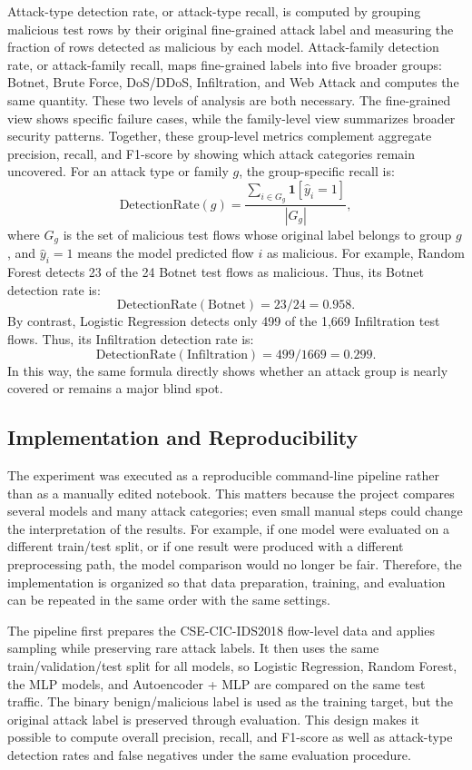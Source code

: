 \documentclass[sigconf,nonacm]{acmart}
\begin{document}
Attack-type detection rate, or attack-type recall, is computed by grouping malicious test rows by their original fine-grained attack label and measuring the fraction of rows detected as malicious by each model.
Attack-family detection rate, or attack-family recall, maps fine-grained labels into five broader groups: Botnet, Brute Force, DoS/DDoS, Infiltration, and Web Attack and computes the same quantity.
These two levels of analysis are both necessary.
The fine-grained view shows specific failure cases, while the family-level view summarizes broader security patterns.
Together, these group-level metrics complement aggregate precision, recall, and F1-score by showing which attack categories remain uncovered.
For an attack type or family \(g\), the group-specific recall is:
\begin{equation}
\mathrm{DetectionRate}(g) =
\frac{\sum_{i \in G_g} \mathbf{1}[\hat{y}_i = 1]}
{|G_g|},
\end{equation}
where \(G_g\) is the set of malicious test flows whose original label belongs to group \(g\), and \(\hat{y}_i=1\) means the model predicted flow \(i\) as malicious.
For example, Random Forest detects 23 of the 24 Botnet test flows as malicious.
Thus, its Botnet detection rate is:
\[
\mathrm{DetectionRate}(\mathrm{Botnet}) = 23/24 = 0.958.
\]
By contrast, Logistic Regression detects only 499 of the 1,669 Infiltration test flows.
Thus, its Infiltration detection rate is:
\[
\mathrm{DetectionRate}(\mathrm{Infiltration}) = 499/1669 = 0.299.
\]
In this way, the same formula directly shows whether an attack group is nearly covered or remains a major blind spot.

\subsection{Implementation and Reproducibility}

The experiment was executed as a reproducible command-line pipeline rather than as a manually edited notebook.
This matters because the project compares several models and many attack categories; even small manual steps could change the interpretation of the results.
For example, if one model were evaluated on a different train/test split, or if one result were produced with a different preprocessing path, the model comparison would no longer be fair.
Therefore, the implementation is organized so that data preparation, training, and evaluation can be repeated in the same order with the same settings.

The pipeline first prepares the CSE-CIC-IDS2018 flow-level data and applies sampling while preserving rare attack labels.
It then uses the same train/validation/test split for all models, so Logistic Regression, Random Forest, the MLP models, and Autoencoder + MLP are compared on the same test traffic.
The binary benign/malicious label is used as the training target, but the original attack label is preserved through evaluation.
This design makes it possible to compute overall precision, recall, and F1-score as well as attack-type detection rates and false negatives under the same evaluation procedure.
\end{document}
